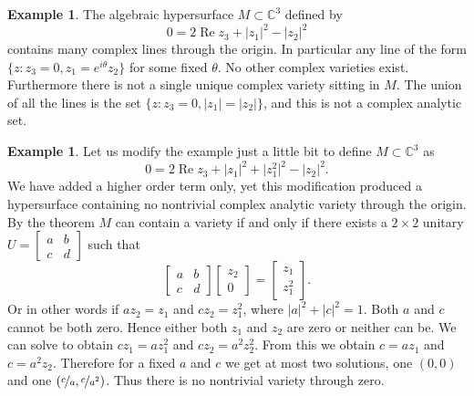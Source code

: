 \documentclass[12pt,openany]{book}
\renewcommand{\Re}{\operatorname{Re}}
\newcommand{\sabs}[1]{\lvert {#1} \rvert}
\newcommand{\abs}[1]{\left\lvert {#1} \right\rvert}
\newcommand{\C}{{\mathbb{C}}}
\theoremstyle{plain}
\theoremstyle{remark}
\theoremstyle{definition}
\theoremstyle{exercise}
\theoremstyle{example}
\newtheorem{example}[thm]{Example}
\begin{document}
\begin{example}
The algebraic hypersurface $M \subset \C^3$ defined by
\begin{equation}
0= 2 \Re z_3 + \abs{z_1}^2 - \abs{z_2}^2
\end{equation}
contains many complex lines through the origin.  In particular any line of the
form $\{ z : z_3 = 0, z_1 = e^{i\theta} z_2 \}$ for some fixed $\theta$.
No other complex varieties exist.  Furthermore there is not
a single unique complex variety sitting in $M$.  The union of all the lines
is the set
$\{ z : z_3 = 0, \abs{z_1} = \abs{z_2} \}$, and this is not a complex
analytic set.
\end{example}

\begin{example}
Let us modify the example just a little bit to define $M \subset \C^3$ as
\begin{equation}
0=2 \Re z_3 + \sabs{z_1}^2 + \sabs{z_1^2}^2 - \sabs{z_2}^2 .
\end{equation}
We have added a higher order term only, yet this modification produced a
hypersurface containing no nontrivial complex analytic variety through the
origin.
By the theorem $M$ can contain a variety if and only if there exists a $2
\times 2$ unitary $U =
\left[ \begin{smallmatrix} a & b \\ c & d \end{smallmatrix} \right]$ such that
\begin{equation}
\begin{bmatrix} a & b \\ c & d \end{bmatrix}
\begin{bmatrix} z_2 \\ 0 \end{bmatrix} =
\begin{bmatrix} z_1 \\ z_1^2 \end{bmatrix} .
\end{equation}
Or in other words if $a z_2 = z_1$ and $c z_2 = z_1^2$, where $\abs{a}^2 +
\abs{c}^2 = 1$.  Both $a$ and $c$ cannot be both zero.
Hence either both
$z_1$ and $z_2$ are zero or neither can be.
We can solve
to obtain $c z_1 = a z_1^2$ and $c z_2 = a^2 z_2^2$.  From this we obtain
$c = a z_1$ and $c = a^2 z_2$.  Therefore for a fixed $a$ and $c$ we get
at most two solutions, one $(0,0)$ and one $(\nicefrac{c}{a},
\nicefrac{c}{a^2})$.  Thus there is no nontrivial variety through zero.
\end{example}
\end{document}
